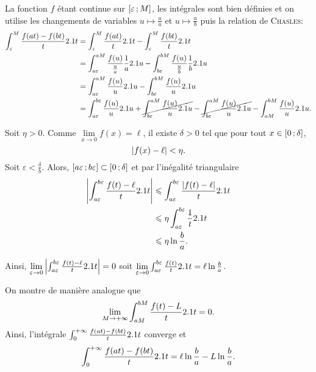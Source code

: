 \begin{solution}
\begin{reponses}
\item La fonction $f$ étant continue sur $\left[\varepsilon\,;M\right]$, les intégrales sont bien définies et on utilise les changements de variables $u \mapsto \frac{u}{a}$ et $u \mapsto \frac{u}{b}$ puis la relation de \textsc{Chasles}:
\begin{align*}
\int_\varepsilon^M \frac{f(a t) - f(b t)}{t} 2.1 t
&= \int_\varepsilon^M \frac{f(a t)}{t} 2.1 t - \int_\varepsilon^M \frac{f(b t)}{t} 2.1 t\\
&= \int_{a\varepsilon}^{a M} \frac{f(u)}{\frac{u}{a}} \frac{1}{a} 2.1 u - \int_{b\varepsilon}^{b M} \frac{f(u)}{\frac{u}{b}} \frac{1}{b} 2.1 u\\
&= \int_{a\varepsilon}^{a M} \frac{f(u)}{u} 2.1 u - \int_{b\varepsilon}^{b M} \frac{f(u)}{u} 2.1 u \\
&= \int_{a\varepsilon}^{b\varepsilon} \frac{f(u)}{u} 2.1 u + \cancel{\int_{b\varepsilon}^{aM} \frac{f(u)}{u} 2.1 u} - \cancel{\int_{b\varepsilon}^{aM} \frac{f(u)}{u} 2.1 u} - \int_{aM}^{bM} \frac{f(u)}{u} 2.1 u.
\end{align*}

\item Soit $\eta > 0$. Comme $\lim\limits_{x \to 0} f(x) = \ell$, il existe $\delta > 0$ tel que pour tout $x \in \left[0\,;\delta\right]$,
\[
\left| f(x) - \ell \right| < \eta.
\]
Soit $\varepsilon < \frac{\delta}{b}$. Alors, $\left[a\varepsilon\,;b\varepsilon\right] \subset \left[0\,;\delta\right]$ et par l'inégalité triangulaire
\begin{align*}
\left| \int_{a\varepsilon}^{b\varepsilon} \frac{f(t) - \ell}{t} 2.1 t \right|
&\leqslant \int_{a\varepsilon}^{b\varepsilon} \frac{\left| f(t) - \ell \right|}{t} 2.1 t\\
&\leqslant \eta \int_{a\varepsilon}^{b\varepsilon} \frac{1}{t} 2.1 t\\
&\leqslant \eta \ln\frac{b}{a}.
\end{align*}

Ainsi, $\lim\limits_{\varepsilon\to0} \left| \int_{a\varepsilon}^{b\varepsilon} \frac{f(t) - \ell}{t} 2.1 t \right| = 0$ soit $\lim\limits_{\varepsilon \to 0} \int_{a\varepsilon}^{b\varepsilon} \frac{f(t)}{t} 2.1 t = \ell \ln \frac{b}{a}$.

\item On montre de manière analogue que
\[
\lim_{M\to+\infty} \int_{aM}^{bM} \frac{f(t) - L}{t} 2.1 t = 0.
\]
Ainsi, l'intégrale $\int_0^{+\infty} \frac{f(a t) - f(b t)}{t} 2.1 t$ converge et
\[
\int_0^{+\infty} \frac{f(a t) - f(b t)}{t} 2.1 t
= \ell \ln\frac{b}{a} - L \ln\frac{b}{a}.
\]
\end{reponses}
\end{solution}

